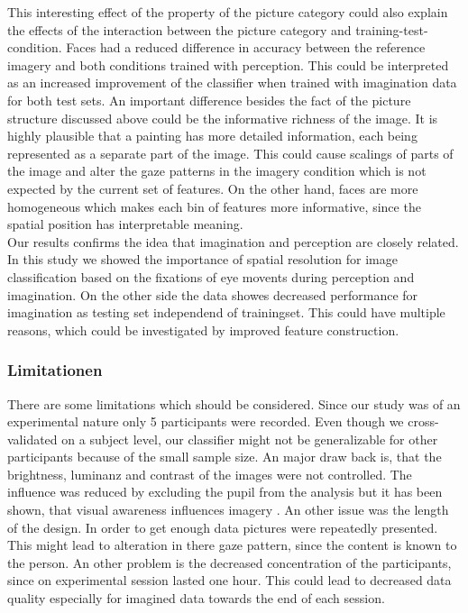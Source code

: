 \documentclass[a4paper,man,natbib,floatsintext]{apa6}
\begin{document}
This interesting effect of the property of the picture category could also explain the effects of the interaction between the picture category and training-test-condition. Faces had a reduced difference in accuracy between the reference imagery and both conditions trained with perception. This could be interpreted as an increased improvement of the classifier when trained with imagination data for both test sets. An important difference besides the fact of the picture structure discussed above could be the informative richness of the image. It is highly plausible that a painting has more detailed information, each being represented as a separate part of the image. This could cause scalings of parts of the image and alter the gaze patterns in the imagery condition which is not expected by the current set of features. On the other hand, faces are more homogeneous which makes each bin of features more informative, since the spatial position has interpretable meaning. \\
Our results confirms the idea that imagination and perception are closely related. In this study we showed the importance of spatial resolution for image classification based on the fixations of eye movents during perception and imagination. On the other side the data showes decreased performance for imagination as testing set independend of trainingset. This could have multiple reasons, which could be investigated by improved feature construction.

\subsubsection{Limitationen}
There are some limitations which should be considered. Since our study was of an experimental nature only 5 participants were recorded. Even though we cross-validated on a subject level, our classifier might not be generalizable for other participants because of the small sample size. 
An major draw back is, that the brightness, luminanz and contrast of the images were not controlled. The influence was reduced by excluding the pupil from the analysis but it has been shown, that visual awareness influences imagery \citep{Pearson2015}. An other issue was the length of the design. In order to get enough data pictures were repeatedly presented. This might lead to alteration in there gaze pattern, since the content is known to the person. An other problem is the decreased concentration of the participants, since on experimental session lasted one hour. This could lead to decreased data quality especially for imagined data towards the end of each session.
\end{document}

